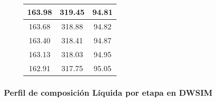 \begin{figure}[H]
\begin{tabular}{|c|c|c|}
        \hline
        163.98         & 319.45          & 94.81                        \\
        \hline
        163.68         & 318.88          & 94.82                        \\
        \hline
        163.40         & 318.41          & 94.87                        \\
        \hline
        163.13         & 318.03          & 94.95                        \\
        \hline
        162.91         & 317.75          & 95.05                        \\
        \hline
    \end{tabular}
    \normalsize
\end{figure}

\newpage

\subsubsection{Perfil de composición Líquida por etapa en DWSIM}

